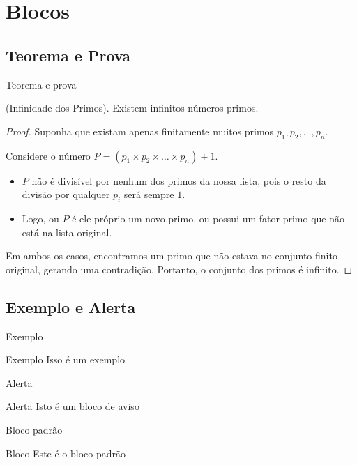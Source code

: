 \documentclass[aspect ratio = 169]{beamer}
\begin{document}
\section{Blocos}

\subsection{Teorema e Prova}

\begin{frame}{Teorema e prova}

\begin{theorem}{(Infinidade dos Primos).}
    Existem infinitos números primos.
  \end{theorem}

  \begin{proof}
    Suponha que existam apenas finitamente muitos primos $p_1, p_2, \dots, p_n$. 
    
    Considere o número $P = (p_1 \times p_2 \times \dots \times p_n) + 1$.
    
    \begin{itemize}
        \item $P$ não é divisível por nenhum dos primos da nossa lista, pois o resto da divisão por qualquer $p_i$ será sempre $1$.
        \item Logo, ou $P$ é ele próprio um novo primo, ou possui um fator primo que não está na lista original.
    \end{itemize}
    
    Em ambos os casos, encontramos um primo que não estava no conjunto finito original, gerando uma contradição. Portanto, o conjunto dos primos é infinito.
  \end{proof}
    
\end{frame}

\subsection{Exemplo e Alerta}

\begin{frame}{Exemplo}

\begin{exampleblock}{Exemplo}
    Isso é um exemplo
\end{exampleblock}
    
\end{frame}

\begin{frame}{Alerta}

\begin{alertblock}{Alerta}
    Isto é um bloco de aviso
\end{alertblock}
    
\end{frame}

\begin{frame}{Bloco padrão}

\begin{block}{Bloco}
    Este é o bloco padrão
\end{block}
    
\end{frame}
\end{document}
